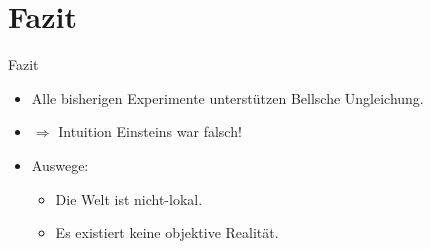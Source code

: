 \documentclass{beamer}
\begin{document}
\section{Fazit}
\begin{frame}{Fazit}
    \begin{itemize}
        \item Alle bisherigen Experimente unterst\"utzen Bellsche Ungleichung.
        \item $\Rightarrow$ Intuition Einsteins war falsch!
        \item<2-> Auswege:
            \begin{itemize}
                \item Die Welt ist nicht-lokal.
                \item Es existiert keine objektive Realit\"at.
            \end{itemize}
    \end{itemize}
\end{frame}
\end{document}
